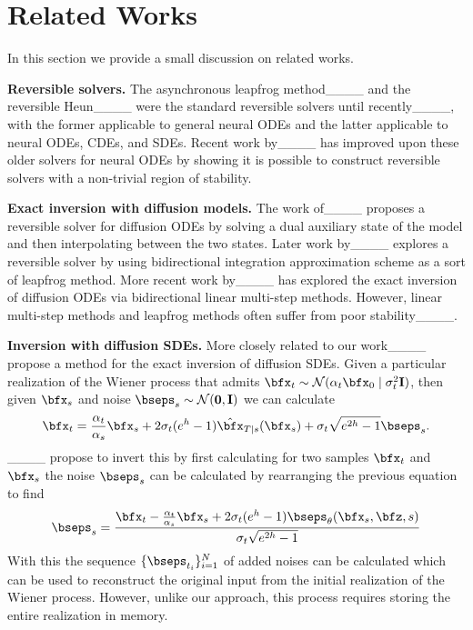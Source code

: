 \section{Related Works}
In this section we provide a small discussion on related works.

\textbf{Reversible solvers.} The asynchronous leapfrog method____ and the reversible Heun____ were the standard reversible solvers until recently____, with the former applicable to general neural ODEs and the latter applicable to neural ODEs, CDEs, and SDEs.
Recent work by____ has improved upon these older solvers for neural ODEs by showing it is possible to construct reversible solvers with a non-trivial region of stability.

\textbf{Exact inversion with diffusion models.}
The work of____ proposes a reversible solver for diffusion ODEs by solving a dual auxiliary state of the model and then interpolating between the two states.
Later work by____ explores a reversible solver by using bidirectional integration approximation scheme as a sort of leapfrog method.
More recent work by____ has explored the exact inversion of diffusion ODEs via bidirectional linear multi-step methods.
However, linear multi-step methods and leapfrog methods often suffer from poor stability____.


\textbf{Inversion with diffusion SDEs.}
More closely related to our work____ propose a method for the exact inversion of diffusion SDEs.
Given a particular realization of the Wiener process that admits $\bfx_t \sim \mathcal{N}(\alpha_t \bfx_0 \mid \sigma_t^2\mathbf{I})$, then given $\bfx_s$ and noise $\bseps_s \sim \mathcal{N}(\mathbf0, \mathbf I)$ we can calculate
\begin{equation}
    \bfx_t = \frac{\alpha_t}{\alpha_s} \bfx_s + 2\sigma_t(e^h-1)\hat\bfx_{T|s}(\bfx_s) + \sigma_t\sqrt{e^{2h}-1}\bseps_s.
\end{equation}
____ propose to invert this by first calculating for two samples $\bfx_t$ and $\bfx_s$ the noise $\bseps_s$ can be calculated by rearranging the previous equation to find
\begin{equation}
    \bseps_s = \frac{\bfx_t - \frac{\alpha_t}{\alpha_s}\bfx_s + 2 \sigma_t (e^h - 1) \bseps_\theta(\bfx_s, \bfz, s)}{\sigma_t \sqrt{e^{2h} - 1}}
\end{equation}
With this the sequence $\{\bseps_{t_i}\}_{i=1}^N$ of added noises can be calculated which can be used to reconstruct the original input from the initial realization of the Wiener process.
However, unlike our approach, this process requires storing the entire realization in memory.